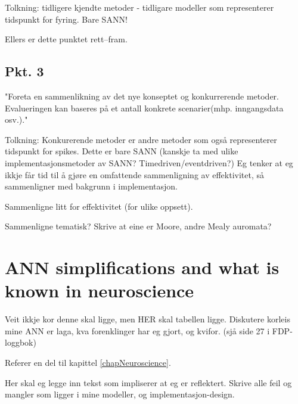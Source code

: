 \documentclass[a4paper,11 pt]{report}
\begin{document}
Tolkning: tidligere kjendte metoder - tidligare modeller som representerer tidspunkt for fyring. Bare SANN!

Ellers er dette punktet rett--fram.

	\section{Pkt. 3}
"Foreta en sammenlikning av det nye konseptet og konkurrerende metoder. Evalueringen kan baseres på et antall konkrete scenarier(mhp. inngangsdata osv.)."

Tolkning:
Konkurerende metoder er andre metoder som også representerer tidspunkt for spikes. Dette er bare SANN (kanskje ta med ulike implementasjonsmetoder av SANN? Timedriven/eventdriven?)
Eg tenker at eg ikkje får tid til å gjøre en omfattende sammenligning av effektivitet, så sammenligner med bakgrunn i implementasjon. 

Sammenligne litt for effektivitet (for ulike oppsett).

Sammenligne tematisk? Skrive at eine er Moore, andre Mealy auromata?


\tableofcontents

\newpage

\newpage



\newpage




\newpage









\chapter{ANN simplifications and what is known in neuroscience}
Veit ikkje kor denne skal ligge, men
HER skal tabellen ligge. Diskutere korleis mine ANN er laga, kva forenklinger har eg gjort, og kvifor. (sjå side 27 i FDP-loggbok)

Referer en del til kapittel \ref{chapNeuroscience}.

Her skal eg legge inn tekst som impliserer at eg er reflektert. Skrive alle feil og mangler som ligger i mine modeller, og implementasjon-design.









%

\end{document}
